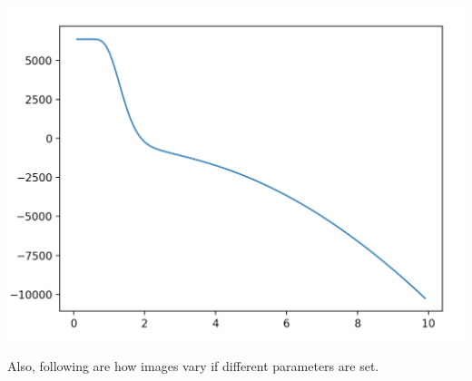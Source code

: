 \documentclass{article}
\begin{document}
    \begin{center}
        \includegraphics[scale=.27]{./data/3/plot.png}
    \end{center}
    \pagebreak
    Also, following are how images vary if different parameters are set.
\end{document}
